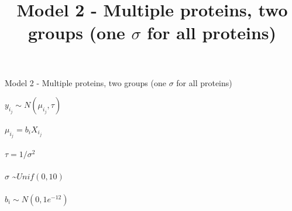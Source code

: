 \documentclass[12pt]{article}
\title{Model 2 - Multiple proteins, two groups (one $\sigma$ for all proteins)}
\begin{document}
\begin{center}{\LARGE Model 2 - Multiple proteins, two groups (one $\sigma$ for all proteins)}\end{center} 

\hspace{0.2in}

$y_i_j \sim N(\mu_i_j, \tau)$ 
\\

\\
$\mu_i_j = b_iX_i_j$
\\

\\
$\tau= 1/\sigma^2$
\\

\\
$\sigma$ \sim $Unif(0, 10)$
\\

\\
$b_i \sim N(0, 1e^{-12})$
\\

\\

\\

\\
\\
\\
\\
\\

\\

\\
\end{document}
